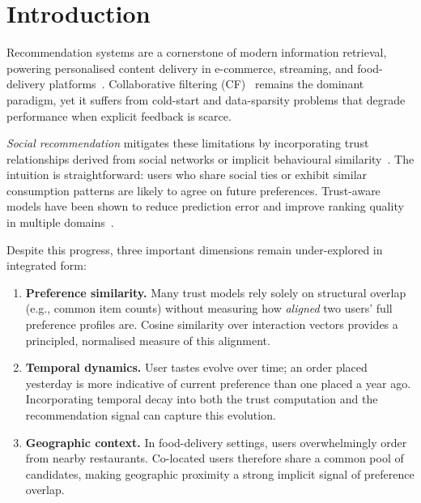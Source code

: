 \documentclass[conference]{IEEEtran}
\begin{document}
\section{Introduction}
\label{sec:intro}

Recommendation systems are a cornerstone of modern information retrieval,
powering personalised content delivery in e-commerce, streaming, and
food-delivery platforms~\cite{resnick1997recommender, adomavicius2005toward}.
Collaborative filtering (CF)~\cite{koren2009matrix} remains the dominant
paradigm, yet it suffers from cold-start and data-sparsity problems that
degrade performance when explicit feedback is scarce.

\emph{Social recommendation} mitigates these limitations by incorporating
trust relationships derived from social networks or implicit behavioural
similarity~\cite{massa2007trust, jamali2010matrix}.  The intuition is
straightforward: users who share social ties or exhibit similar consumption
patterns are likely to agree on future preferences.  Trust-aware models
have been shown to reduce prediction error and improve ranking quality in
multiple domains~\cite{ma2011recommender, yang2017social}.

Despite this progress, three important dimensions remain under-explored in
integrated form:

\begin{enumerate}
  \item \textbf{Preference similarity.}  Many trust models rely solely on
        structural overlap (e.g., common item counts) without measuring how
        \emph{aligned} two users' full preference profiles are.  Cosine
        similarity over interaction vectors provides a principled,
        normalised measure of this alignment.

  \item \textbf{Temporal dynamics.}  User tastes evolve over time; an order
        placed yesterday is more indicative of current preference than one
        placed a year ago.  Incorporating temporal decay into both the trust
        computation and the recommendation signal can capture this evolution.

  \item \textbf{Geographic context.}  In food-delivery settings, users
        overwhelmingly order from nearby restaurants.  Co-located users
        therefore share a common pool of candidates, making geographic
        proximity a strong implicit signal of preference overlap.
\end{enumerate}
\end{document}
